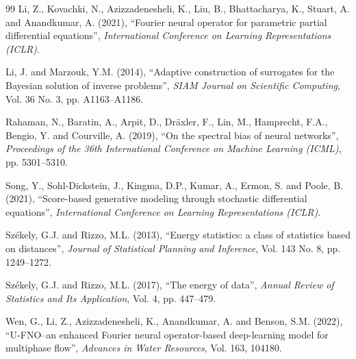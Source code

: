\documentclass[12pt]{article}
\begin{document}
\begin{thebibliography}{99}
 Li, Z., Kovachki, N., Azizzadenesheli, K., Liu, B., Bhattacharya, K., Stuart, A. and Anandkumar, A. (2021), ``Fourier neural operator for parametric partial differential equations'', \emph{International Conference on Learning Representations (ICLR)}.

 Li, J. and Marzouk, Y.M. (2014), ``Adaptive construction of surrogates for the Bayesian solution of inverse problems'', \emph{SIAM Journal on Scientific Computing}, Vol. 36 No. 3, pp. A1163--A1186.

 Rahaman, N., Baratin, A., Arpit, D., Dr\"axler, F., Lin, M., Hamprecht, F.A., Bengio, Y. and Courville, A. (2019), ``On the spectral bias of neural networks'', \emph{Proceedings of the 36th International Conference on Machine Learning (ICML)}, pp. 5301--5310.

 Song, Y., Sohl-Dickstein, J., Kingma, D.P., Kumar, A., Ermon, S. and Poole, B. (2021), ``Score-based generative modeling through stochastic differential equations'', \emph{International Conference on Learning Representations (ICLR)}.

 Sz\'ekely, G.J. and Rizzo, M.L. (2013), ``Energy statistics: a class of statistics based on distances'', \emph{Journal of Statistical Planning and Inference}, Vol. 143 No. 8, pp. 1249--1272.

 Sz\'ekely, G.J. and Rizzo, M.L. (2017), ``The energy of data'', \emph{Annual Review of Statistics and Its Application}, Vol. 4, pp. 447--479.

 Wen, G., Li, Z., Azizzadenesheli, K., Anandkumar, A. and Benson, S.M. (2022), ``U-FNO--an enhanced Fourier neural operator-based deep-learning model for multiphase flow'', \emph{Advances in Water Resources}, Vol. 163, 104180.

\end{thebibliography}
\end{document}
